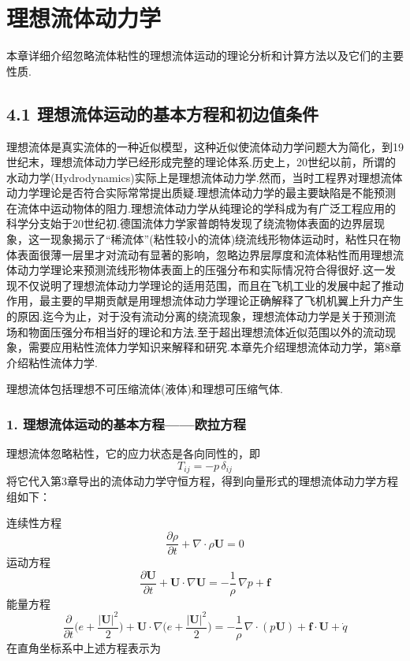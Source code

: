 \chapter{理想流体动力学}

本章详细介绍忽略流体粘性的理想流体运动的理论分析和计算方法以及它们的主要性质.

\section*{4.1  理想流体运动的基本方程和初边值条件}

理想流体是真实流体的一种近似模型，这种近似使流体动力学问题大为简化，到19世纪末，理想流体动力学已经形成完整的理论体系.历史上，20世纪以前，所谓的水动力学(Hydrodynamics)实际上是理想流体动力学.然而，当时工程界对理想流体动力学理论是否符合实际常常提出质疑.理想流体动力学的最主要缺陷是不能预测在流体中运动物体的阻力.理想流体动力学从纯理论的学科成为有广泛工程应用的科学分支始于20世纪初.德国流体力学家普朗特发现了绕流物体表面的边界层现象，这一现象揭示了“稀流体”(粘性较小的流体)绕流线形物体运动时，粘性只在物体表面很薄一层里才对流动有显著的影响，忽略边界层厚度和流体粘性而用理想流体动力学理论来预测流线形物体表面上的压强分布和实际情况符合得很好.这一发现不仅说明了理想流体动力学理论的适用范围，而且在飞机工业的发展中起了推动作用，最主要的早期贡献是用理想流体动力学理论正确解释了飞机机翼上升力产生的原因.迄今为止，对于没有流动分离的绕流现象，理想流体动力学是关于预测流场和物面压强分布相当好的理论和方法.至于超出理想流体近似范围以外的流动现象，需要应用粘性流体力学知识来解释和研究.本章先介绍理想流体动力学，第8章介绍粘性流体力学.

理想流体包括理想不可压缩流体(液体)和理想可压缩气体.

\subsection*{1. 理想流体运动的基本方程——欧拉方程}

理想流体忽略粘性，它的应力状态是各向同性的，即
\begin{equation*}
T_{ij}=-p\,\delta_{ij}
\tag{4.1}
\end{equation*}
将它代入第3章导出的流体动力学守恒方程，得到向量形式的理想流体动力学方程组如下：

连续性方程
\begin{equation*}
\frac{\partial\rho}{\partial t}+\nabla\cdot\rho\boldsymbol{U}=0
\tag{4.2a}
\end{equation*}
运动方程
\begin{equation*}
\frac{\partial\boldsymbol{U}}{\partial t}+\boldsymbol{U}\cdot\nabla\boldsymbol{U}=-\frac{1}{\rho}\,\nabla p+\boldsymbol{f}
\tag{4.2b}
\end{equation*}
能量方程
\begin{equation*}
\frac{\partial}{\partial t}\Big(e+\frac{|\boldsymbol{U}|^{2}}{2}\Big)+\boldsymbol{U}\cdot\nabla\Big(e+\frac{|\boldsymbol{U}|^{2}}{2}\Big)=-\frac{1}{\rho}\,\nabla\cdot(p\boldsymbol{U})+\boldsymbol{f}\cdot\boldsymbol{U}+\dot{q}
\tag{4.2c}
\end{equation*}
在直角坐标系中上述方程表示为

